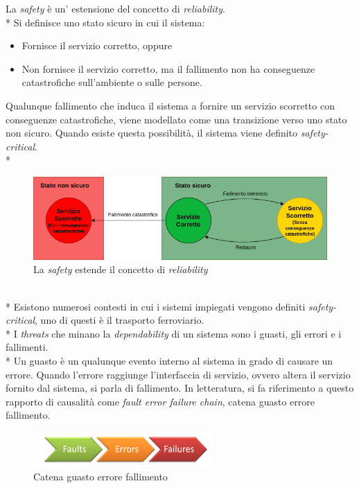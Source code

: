La \emph{safety} \`e un' estensione del concetto di \emph{reliability}.\\*
Si definisce uno stato sicuro in cui il sistema:
\begin{itemize}
	\item Fornisce il servizio corretto, oppure
	\item Non fornisce il servizio corretto, ma il fallimento non ha conseguenze catastrofiche sull'ambiente o sulle persone.
\end{itemize}
Qualunque fallimento che induca il sistema a fornire un servizio scorretto con conseguenze catastrofiche, viene modellato come una transizione verso uno stato non sicuro. Quando esiste questa possibilit\`a, il sistema viene definito \emph{safety-critical}. \cite{safetycritical}\\*
\begin{figure}[h]
	\centering
	\includegraphics[width=0.7\linewidth]{img/safety}
	\caption{La \emph{safety} estende il concetto di \emph{reliability}}
	\label{fig:safety}
\end{figure}\\*
Esistono numerosi contesti in cui i sistemi impiegati vengono definiti \emph{safety-critical}, uno di questi \`e il trasporto ferroviario.\\*
I \emph{threats} che minano la \emph{dependability} di un sistema sono i guasti, gli errori e i fallimenti.\\*
Un guasto \`e un qualunque evento interno al sistema in grado di causare un errore. Quando l'errore raggiunge l'interfaccia di servizio, ovvero altera il servizio fornito dal sistema, si parla di fallimento. In letteratura, si fa riferimento a questo rapporto di causalit\`a come \emph{fault error failure chain}, catena guasto errore fallimento.
\begin{figure}[h]
	\centering
	\includegraphics[width=0.7\linewidth]{img/gefpng}
	\caption{Catena guasto errore fallimento}
	\label{fig:gefpng}
\end{figure}\newpage
